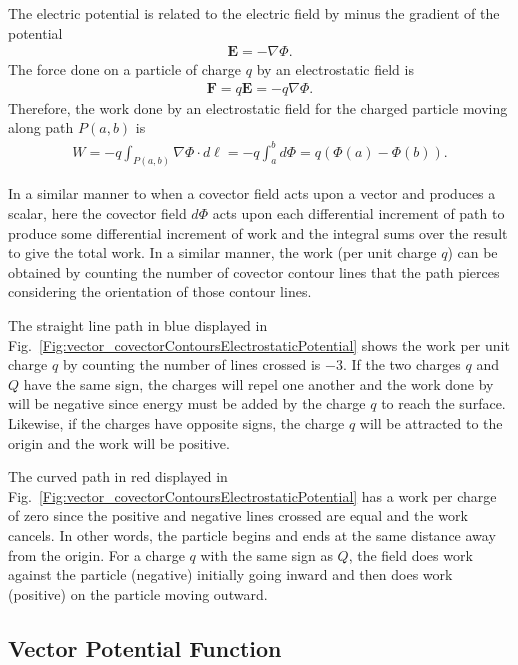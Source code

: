 The electric potential is related to the electric field by minus the gradient of the potential
\begin{align}
  \mathbf{E} = -\nabla \Phi .
\end{align}
The force done on a particle of charge $q$ by an electrostatic field is
\begin{align}
  \mathbf{F} = q \mathbf{E} = -q \nabla \Phi.
\end{align}
Therefore, the work done by an electrostatic field for the charged particle moving along path $P(a,b)$ is
\begin{align}
  W = -q \int_{P(a,b)}  \nabla \Phi \cdot d\boldsymbol\ell = -q \int_a^b d \Phi = q \left( \Phi(a) - \Phi(b) \right) .
\end{align}

In a similar manner to when a covector field acts upon a vector and produces a scalar, here the covector field $d \Phi$ acts upon each differential increment of path to produce some differential increment of work and the integral sums over the result to give the total work. In a similar manner, the work (per unit charge $q$) can be obtained by counting the number of covector contour lines that the path pierces considering the orientation of those contour lines. 

The straight line path in blue displayed in Fig.~\ref{Fig:vector_covectorContoursElectrostaticPotential} shows the work per unit charge $q$ by counting the number of lines crossed is $-3$. If the two charges $q$ and $Q$ have the same sign, the charges will repel one another and the work done by will be negative since energy must be added by the charge $q$ to reach the surface. Likewise, if the charges have opposite signs, the charge $q$ will be attracted to the origin and the work will be positive.

The curved path in red displayed in Fig.~\ref{Fig:vector_covectorContoursElectrostaticPotential} has a work per charge of zero since the positive and negative lines crossed are equal and the work cancels. In other words, the particle begins and ends at the same distance away from the origin. For a charge $q$ with the same sign as $Q$, the field does work against the particle (negative) initially going inward and then does work (positive) on the particle moving outward.


\subsection{Vector Potential Function}

